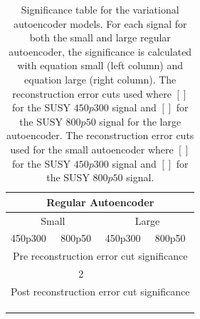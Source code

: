 \begin{table}[H]
    \centering
    \caption[Significance table variational autoencoder]{Significance table for the variational autoencoder models. For each signal for both the small and 
    large regular autoencoder, the significance is calculated with equation small (left column) and equation large (right column). The 
    reconstruction error cuts used where $[]$ for the SUSY $450p300$ signal and $[]$ for the SUSY 
    $800p50$ signal for the large autoencoder. The reconstruction error cuts used for the small autoencoder where $[]$ 
    for the SUSY $450p300$ signal and $[]$ for the SUSY $800p50$ signal. }
    \label{tab:AE_2lep_significance}
    \begin{tabular}{|llllllll|}
    \hline
    \multicolumn{8}{|c|}{Regular Autoencoder}                                                                                                                                    \\ \hline
    \multicolumn{4}{|c|}{Small}                                                                    & \multicolumn{4}{c|}{Large}                                                  \\ \hline
    \multicolumn{2}{|l|}{450p300}                  & \multicolumn{2}{l|}{800p50}                   & \multicolumn{2}{l|}{450p300}                  & \multicolumn{2}{l|}{800p50} \\ \hline
    \multicolumn{8}{|c|}{Pre reconstruction error cut significance}                                                                                                                           \\ \hline
    \multicolumn{1}{|l|}{} & \multicolumn{1}{l|}{} & \multicolumn{1}{l|}{} & \multicolumn{1}{l|}{2} & \multicolumn{1}{l|}{} & \multicolumn{1}{l|}{} & \multicolumn{1}{l|}{}  & \multicolumn{1}{l|}{} \\ \hline
    \multicolumn{8}{|c|}{Post reconstruction error  cut significance}                                                                                                                         \\ \hline
    \multicolumn{1}{|l|}{} & \multicolumn{1}{l|}{} & \multicolumn{1}{l|}{} & \multicolumn{1}{l|}{} & \multicolumn{1}{l|}{} & \multicolumn{1}{l|}{} & \multicolumn{1}{l|}{}   & \multicolumn{1}{l|}{}  \\ \hline
    \multicolumn{1}{|l|}{} & \multicolumn{1}{l|}{} & \multicolumn{1}{l|}{} & \multicolumn{1}{l|}{} & \multicolumn{1}{l|}{} & \multicolumn{1}{l|}{} & \multicolumn{1}{l|}{}   & \multicolumn{1}{l|}{}  \\ \hline
    \multicolumn{1}{|l|}{} & \multicolumn{1}{l|}{} & \multicolumn{1}{l|}{} & \multicolumn{1}{l|}{} & \multicolumn{1}{l|}{} & \multicolumn{1}{l|}{} & \multicolumn{1}{l|}{}   & \multicolumn{1}{l|}{} \\ \hline
    \end{tabular}
\end{table}
